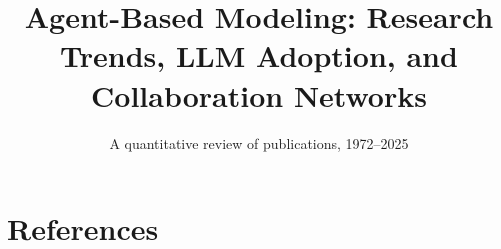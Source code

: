 \documentclass[11pt]{article}
\title{Agent-Based Modeling: Research Trends, LLM Adoption, and Collaboration Networks}
\author{}
\date{A quantitative review of publications, 1972--2025}
\begin{document}
\maketitle
\begin{abstract}

\end{abstract}









\section*{References}

\nocite{*}

\end{document}
